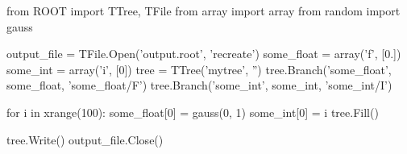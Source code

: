 \begin{footnotesize}
\begin{pyglist}[language=python,texcl=true,abovecaptionskip=0,style=vs,bgcolor=Moccasin]
from ROOT import TTree, TFile
from array import array
from random import gauss

output_file = TFile.Open('output.root', 'recreate')
some_float = array('f', [0.])
some_int = array('i', [0])
tree = TTree('mytree', '')
tree.Branch('some_float', some_float, 'some_float/F')
tree.Branch('some_int', some_int, 'some_int/I')

for i in xrange(100):
    some_float[0] = gauss(0, 1)
    some_int[0] = i
    tree.Fill()

tree.Write()
output_file.Close()
\end{pyglist}
\end{footnotesize}
